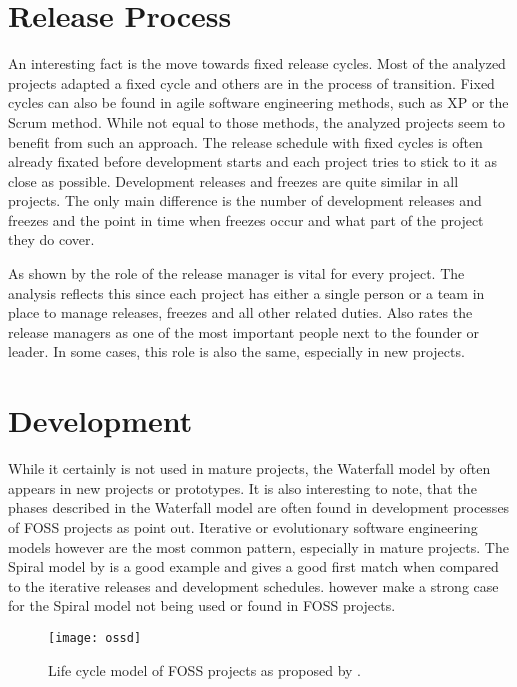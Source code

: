 
\section{Release Process} %

An interesting fact is the move towards fixed release cycles. Most of the
analyzed projects adapted a fixed cycle and others are in the process of
transition. Fixed cycles can also be found in agile software engineering
methods, such as \acl{XP} or the Scrum method. While not equal to those
methods, the analyzed projects seem to benefit from such an approach. The
release schedule with fixed cycles is often already fixated before development
starts and each project tries to stick to it as close as possible. Development
releases and freezes are quite similar in all projects. The only main
difference is the number of development releases and freezes and the point in
time when freezes occur and what part of the project they do cover.

As shown by \textcite{Mockus2002} the role of the release manager is vital for
every project. The analysis reflects this since each project has either a
single person or a team in place to manage releases, freezes and all other
related duties. Also \textcite{Crowston2005} rates the release managers as one
of the most important people next to the founder or leader. In some cases, this
role is also the same, especially in new projects.


\section{Development} %

While it certainly is not used in mature projects, the Waterfall model by
\textcite{Royce1970} often appears in new projects or prototypes. It is also
interesting to note, that the phases described in the Waterfall model are often
found in development processes of \ac{FOSS} projects as \textcite{Roets2007}
point out. Iterative or evolutionary software engineering models however are
the most common pattern, especially in mature projects. The Spiral model by
\textcite{Boehm1988} is a good example and gives a good first match when
compared to the iterative releases and development schedules.
\textcite{Roets2007} however make a strong case for the Spiral model not being
used or found in \ac{FOSS} projects.

\begin{figure}[htbp]
  \centering
  \texttt{[image: ossd]}
  \caption[Life Cycle Model of \acl{FOSS} Projects]
  {Life cycle model of \acl{FOSS} projects as proposed by \textcite{Roets2007}.}
\end{figure}

